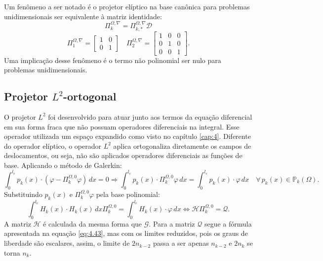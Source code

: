 \indent Um fenômeno a ser notado é o projetor elíptico na base canônica para problemas unidimensionais ser equivalente à matriz identidade: $$\Pi_k^{\Omega,\nabla} = \Pi_{k,*}^{\Omega,\nabla} \mathcal{D}$$
\begin{equation}
    \Pi_1^{\Omega,\nabla} = \begin{bmatrix} 1 & 0 \\ 0 & 1 \end{bmatrix} \quad \Pi_2^{\Omega,\nabla} = \begin{bmatrix} 1 & 0 & 0 \\ 0 & 1 & 0 \\ 0 & 0 & 1 \end{bmatrix}.
\end{equation}
Uma implicação desse fenômeno é o termo não polinomial ser nulo para problemas unidimensionais. 


\subsection{Projetor $L^2$-ortogonal}

\indent O projetor $L^2$ foi desenvolvido para atuar junto aos termos da equação diferencial em sua forma fraca que não possuam operadores diferenciais na integral. Esse operador utilizada um espaço expandido como visto no capítulo \ref{cap:4}. Diferente do operador elíptico, o operador $L^2$ aplica ortogonaliza diretamente os campos de deslocamentos, ou seja, não são aplicados operadores diferenciais as funções de base. Aplicando o método de Galerkin:
\begin{equation}
    \int_0^{l_e} p_k(x) \cdot (\varphi - \Pi_k^{\Omega,0}\varphi) \, dx = 0 \Rightarrow \int_0^{l_e} p_k(x) \cdot \Pi_k^{\Omega,0}\varphi \, dx = \int_0^{l_e} p_k(x) \cdot \varphi \, dx \quad \forall \, p_k(x) \in \mathbb{P}_k(\Omega).
\end{equation}
\indent Substituindo $p_k(x)$ e $\Pi_k^{\Omega,0}\varphi$ pela base polinomial:
\begin{equation}
    \int_0^{l_e} H_k(x) \cdot H_k(x) \, dx \Pi_k^{\Omega,0} = \int_0^{l_e} H_k(x) \cdot \varphi \, dx \Leftrightarrow \mathcal{H} \Pi_k^{\Omega,0} = \mathcal{Q}.
\end{equation}
A matriz $\mathcal{H}$ é calculada da mesma forma que $\mathcal{G}$. Para a matriz $\mathcal{Q}$ segue a fórmula apresentada na equação \ref{eq:4.43}, mas com os limites reduzidos, pois os graus de liberdade são escalares, assim, o limite de $2n_{k-2}$ passa a ser apenas $n_{k-2}$ e $2n_k$ se torna $n_k$.

